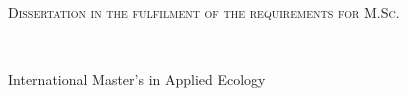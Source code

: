 \begin{titlepage}
\vspace{3cm}

\begin{center}
\begin{large}
\textsc{Dissertation in the fulfilment of the requirements for M.Sc.}
\end{large}
\\
\vspace{1cm}
\begin{Large}
International Master's in Applied Ecology
\end{Large}

\end{center}

\end{titlepage}